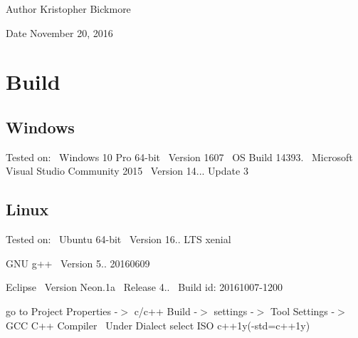 \begin{DoxyAuthor}{Author}
Kristopher Bickmore 
\end{DoxyAuthor}
\begin{DoxyDate}{Date}
November 20, 2016 
\end{DoxyDate}
\hypertarget{index_Build}{}\section{Build}\label{index_Build}
\hypertarget{index_Windows}{}\subsection{Windows}\label{index_Windows}
Tested on\+:~\newline
Windows 10 Pro 64-\/bit~\newline
Version 1607~\newline
OS Build 14393.~\newline
 Microsoft Visual Studio Community 2015~\newline
Version 14... Update 3\hypertarget{index_Linux}{}\subsection{Linux}\label{index_Linux}
Tested on\+:~\newline
Ubuntu 64-\/bit~\newline
Version 16.. L\+TS xenial

G\+NU g++~\newline
Version 5.. 20160609

Eclipse~\newline
Version Neon.\+1a~\newline
Release 4..~\newline
Build id\+: 20161007-\/1200

go to Project Properties -\/$>$ c/c++ Build -\/$>$ settings -\/$>$ Tool Settings -\/$>$ G\+CC C++ Compiler~\newline
Under Dialect select I\+SO c++1y(-\/std=c++1y)


